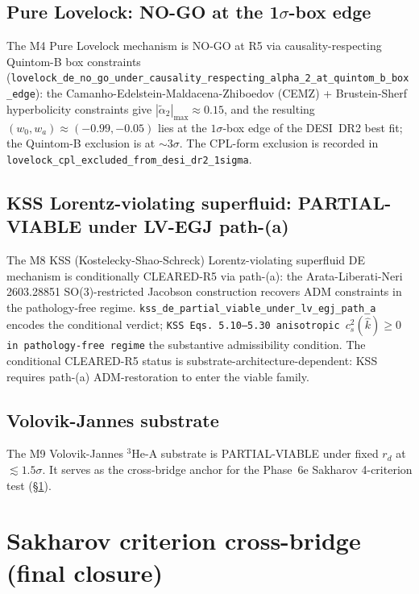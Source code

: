 \documentclass[aps,prd,reprint,nofootinbib,superscriptaddress]{revtex4-2}
\begin{document}
\subsection{Pure Lovelock: NO-GO at the 1$\sigma$-box edge}
\label{subsec:phase6m-track-c-lovelock}

The M4 Pure Lovelock mechanism is NO-GO at R5 via causality-respecting
Quintom-B box constraints
(\texttt{lovelock\_de\_no\_go\_under\_causality\_respecting\_alpha\_2\_at\_quintom\_b\_box\_edge}):
the Camanho-Edelstein-Maldacena-Zhiboedov (CEMZ) + Brustein-Sherf
hyperbolicity constraints give $|\tilde\alpha_2|_{\max} \approx 0.15$,
and the resulting $(w_0, w_a) \approx (-0.99, -0.05)$ lies at the
$1\sigma$-box edge of the DESI~DR2 best fit; the Quintom-B
exclusion is at $\sim 3\sigma$. The CPL-form exclusion is recorded in
\texttt{lovelock\_cpl\_excluded\_from\_desi\_dr2\_1sigma}.

\subsection{KSS Lorentz-violating superfluid: PARTIAL-VIABLE under
LV-EGJ path-(a)}
\label{subsec:phase6m-track-c-kss}

The M8 KSS (Kostelecky-Shao-Schreck) Lorentz-violating superfluid DE
mechanism is conditionally CLEARED-R5 via path-(a): the
Arata-Liberati-Neri 2603.28851 SO(3)-restricted Jacobson construction
recovers ADM constraints in the pathology-free regime.
\texttt{kss\_de\_partial\_viable\_under\_lv\_egj\_path\_a} encodes the
conditional verdict; \texttt{KSS Eqs. 5.10--5.30 anisotropic
$c_s^2(\hat k) \geq 0$ in pathology-free regime} the substantive
admissibility condition. The conditional CLEARED-R5 status is
substrate-architecture-dependent: KSS requires path-(a) ADM-restoration
to enter the viable family.

\subsection{Volovik-Jannes substrate}
\label{subsec:phase6m-track-c-volovik-jannes}

The M9 Volovik-Jannes ${}^3\!\text{He-A}$ substrate is PARTIAL-VIABLE
under fixed $r_d$ at $\lesssim 1.5\sigma$. It serves as the cross-bridge
anchor for the Phase~6e Sakharov 4-criterion test (§\ref{sec:phase6m-sakharov}).



\section{Sakharov criterion cross-bridge (final closure)}
\label{sec:phase6m-sakharov}
\end{document}
